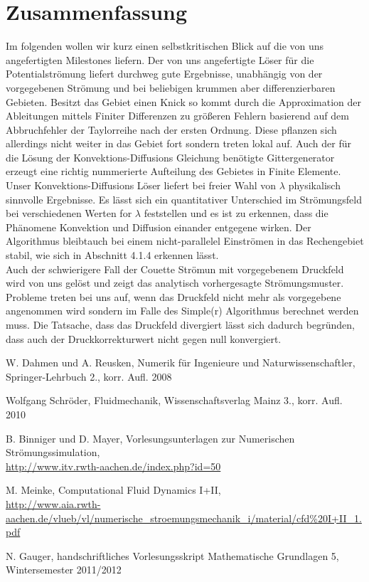 \documentclass{article}
\begin{document}
\section{Zusammenfassung}
Im folgenden wollen wir kurz einen selbstkritischen Blick auf die von uns angefertigten Milestones liefern.
Der von uns angefertigte Löser für die Potentialströmung liefert durchweg gute Ergebnisse, unabhängig von der vorgegebenen Strömung
und bei beliebigen krummen aber differenzierbaren Gebieten. Besitzt das Gebiet einen Knick so kommt durch die Approximation der
Ableitungen mittels Finiter Differenzen zu größeren Fehlern basierend auf dem Abbruchfehler der Taylorreihe nach der ersten Ordnung.
Diese pflanzen sich allerdings nicht weiter in das Gebiet fort sondern treten lokal auf. Auch der für die Lösung der Konvektions-Diffusions
Gleichung benötigte Gittergenerator erzeugt eine richtig nummerierte Aufteilung des Gebietes in Finite Elemente.
Unser Konvektions-Diffusions Löser liefert bei freier Wahl von $\lambda$ physikalisch sinnvolle Ergebnisse. Es lässt sich
ein quantitativer Unterschied im Strömungsfeld bei verschiedenen Werten for $\lambda$ feststellen und es ist zu erkennen,
dass die Phänomene Konvektion und Diffusion einander entgegene wirken. Der Algorithmus bleibtauch bei einem nicht-parallelel Einströmen 
in das Rechengebiet stabil, wie sich in Abschnitt 4.1.4 erkennen lässt.\\
Auch der schwierigere Fall der Couette Strömun mit vorgegebenem Druckfeld wird von uns gelöst und zeigt das analytisch vorhergesagte
Strömungsmuster.\\
Probleme treten bei uns auf, wenn das Druckfeld nicht mehr als vorgegebene angenommen wird sondern im Falle des Simple(r) Algorithmus
berechnet werden muss. Die Tatsache, dass das Druckfeld divergiert lässt sich dadurch begründen, dass auch der Druckkorrekturwert nicht 
gegen null konvergiert.


\begin{thebibliography}{9}

 W. Dahmen und A. Reusken, Numerik
 für Ingenieure und Naturwissenschaftler, Springer-Lehrbuch 2., korr. Aufl. 2008

Wolfgang Schröder, Fluidmechanik, Wissenschaftsverlag Mainz 3., korr. Aufl. 2010

 B. Binniger und D. Mayer, Vorlesungsunterlagen zur Numerischen Strömungssimulation,\\
\url{http://www.itv.rwth-aachen.de/index.php?id=50}

 M. Meinke, Computational Fluid Dynamics I+II,\\
\url{http://www.aia.rwth-aachen.de/vlueb/vl/numerische_stroemungsmechanik_i/material/cfd%20I+II_1.pdf}

 N. Gauger, handschriftliches Vorlesungsskript Mathematische Grundlagen 5, Wintersemester 2011/2012



\end{thebibliography}
\end{document}
